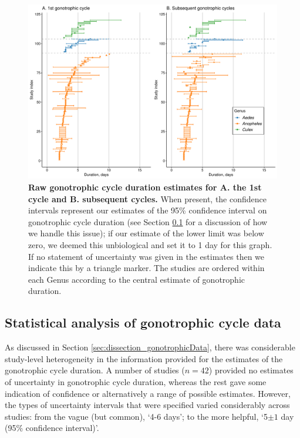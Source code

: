 \documentclass[12pt]{article}
\begin{document}
{\begin{figure}[ht]
	\centerline{\includegraphics[width=1\textwidth]{./Figure_files/gonotrophic_data.pdf}}
	\caption{\textbf{Raw gonotrophic cycle duration estimates for A. the 1st cycle and B. subsequent cycles.} When present, the confidence intervals represent our estimates of the 95\% confidence interval on gonotrophic cycle duration (see Section \ref{sec:dissection_gonotrophicMethod} for a discussion of how we handle this issue); if our estimate of the lower limit was below zero, we deemed this unbiological and set it to 1 day for this graph. If no statement of uncertainty was given in the estimates then we indicate this by a triangle marker. The studies are ordered within each Genus according to the central estimate of gonotrophic duration.}\label{fig:dissection_gonotrophicCycleRaw}
\end{figure}

\subsection{Statistical analysis of gonotrophic cycle data}\label{sec:dissection_gonotrophicMethod}
As discussed in Section \ref{sec:dissection_gonotrophicData}, there was considerable study-level heterogeneity in the information provided for the estimates of the gonotrophic cycle duration. A number of studies ($n=42$) provided no estimates of uncertainty in gonotrophic cycle duration, whereas the rest gave some indication of confidence or alternatively a range of possible estimates. However, the types of uncertainty intervals that were specified varied considerably across studies: from the vague (but common), `4-6 days'; to the more helpful, `5$\pm 1$ day (95\% confidence interval)'. 

}
\end{document}
